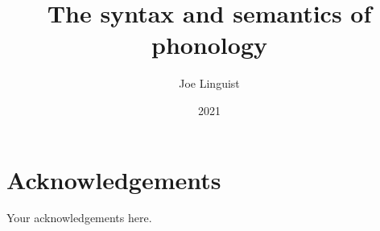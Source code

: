 \documentclass[]{msu-thesis}
\title{The syntax and semantics of phonology}
\author{Joe Linguist}
\date{2021}
\begin{document}
\frontmatter
\maketitlepage


\begin{abstract}
\end{abstract}

\clearpage

\makecopyrightpage

%
%
\clearpage
\chapter*{Acknowledgements}
\DoubleSpacing %
Your acknowledgements here.
%
\clearpage
\SingleSpacing
\tableofcontents* %
\clearpage
\listoftables %
\clearpage
\listoffigures %
%
%
\mainmatter
%
\end{document}
